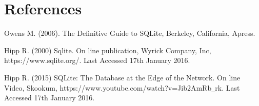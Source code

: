 \section{References}
\label{sec:references}

	

\begin{thebibliography}{0}

Owens M. (2006). The Definitive Guide to SQLite, Berkeley, California, Apress. 

Hipp R. (2000) Sqlite. On line publication, Wyrick  Company, Inc, https://www.sqlite.org/. Last Accessed 17th January 2016.

Hipp R. (2015) SQLite: The Database at the Edge of the Network. On line Video, Skookum, https://www.youtube.com/watch?v=Jib2AmRb\verb|_|rk. Last Accessed 17th January 2016.


\end{thebibliography}